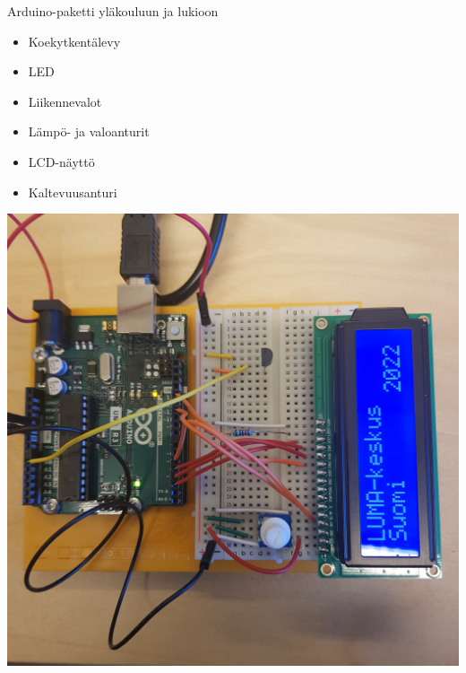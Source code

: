 \documentclass[finnish,oneside]{book}
\begin{document}
\pagestyle{fancy}
\tableofcontents

\clearpage


%
%







\appendix







\clearpage
\pagestyle{plain}
\begin{huge}
Arduino-paketti yläkouluun ja lukioon
\end{huge}


\begin{itemize}
    \item Koekytkentälevy
    \item LED
    \item Liikennevalot
    \item Lämpö- ja valoanturit
    \item LCD-näyttö
    \item Kaltevuusanturi
\end{itemize}

\includegraphics[width=\textwidth]{kuvat/kansikuva_taka2022.jpg}
\end{document}
